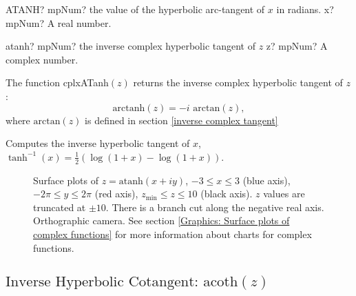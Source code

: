 \begin{mpFunctionsExtract}
	\mpWorksheetFunctionOneNotImplemented
	{ATANH? mpNum? the value of the hyperbolic arc-tangent  of $x$ in radians.}
	{x? mpNum? A real number.}
\end{mpFunctionsExtract}


\vspace{0.6cm}


\begin{mpFunctionsExtract}
	\mpFunctionOne
	{atanh? mpNum? the inverse complex hyperbolic tangent of $z$}
	{z? mpNum? A complex number.}
\end{mpFunctionsExtract}

\vspace{0.3cm}
The function \textsf{cplxATanh$(z)$} returns the inverse complex hyperbolic tangent of $z$: 
\begin{equation}
	\text{arctanh}(z) = -i \text{ arctan}(z),
\end{equation}
where $\text{arctan}(z)$ is defined in section \ref{inverse complex tangent}

Computes the inverse hyperbolic tangent of $x$, $\tanh^{-1}(x)=\tfrac{1}{2} (\log(1+x) - \log(1+x))$.


\begin{figure}[ht]%
	\centering
	\qquad
	\caption[Complex Inverse Hyperbolic Tangent]{Surface plots of $z = \text{atanh}(x + iy)$, $-3 \leq x \leq 3$ (blue axis), $-2 \pi \leq y \leq 2\pi$ (red axis), $z_{\text{min}} \leq z \leq 10$ (black axis). $z$ values are truncated at $\pm 10$. There is a branch cut along the negative real axis. Orthographic camera. See section \ref{Graphics: Surface plots of complex functions} for more information about charts for complex functions.} 
	\label{fig:Complex Inverse Hyperbolic Tangent}%
\end{figure}



\newpage
\subsection{\texorpdfstring{$\text{Inverse Hyperbolic Cotangent: acoth}(z)$}{acoth}}
\label{inverse complex hyperbolic cotangent}

